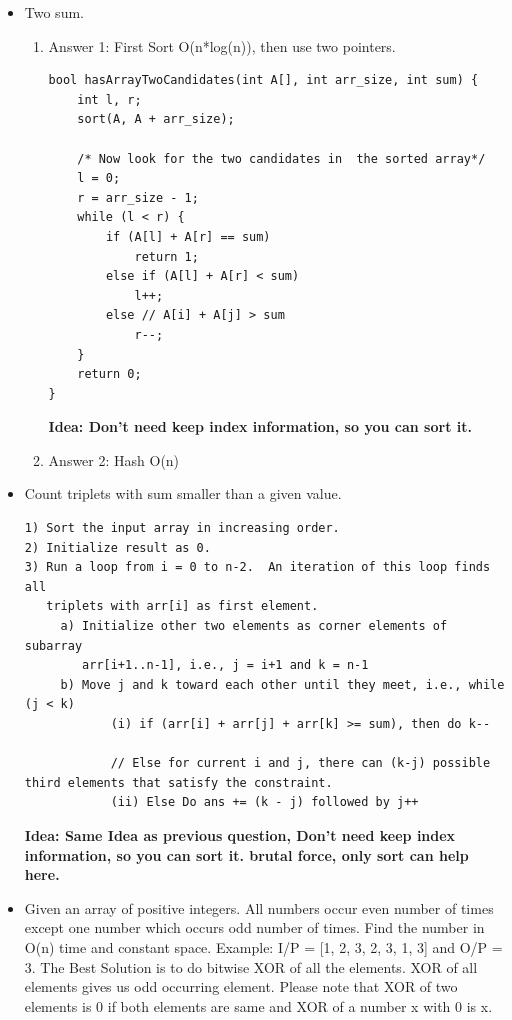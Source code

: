 \documentclass[a4paper,11pt,twoside]{book}
\begin{document}
\begin{itemize}
	\item Two sum. 
\begin{enumerate}
\item Answer 1: First Sort O(n*log(n)), then use two pointers.
\begin{lstlisting}[tabsize=3]
bool hasArrayTwoCandidates(int A[], int arr_size, int sum) { 
	int l, r; 
	sort(A, A + arr_size); 
	
	/* Now look for the two candidates in  the sorted array*/
	l = 0; 
	r = arr_size - 1; 
	while (l < r) { 
		if (A[l] + A[r] == sum) 
			return 1; 
		else if (A[l] + A[r] < sum) 
			l++; 
		else // A[i] + A[j] > sum 
			r--; 
	} 
	return 0; 
} 
\end{lstlisting}
\textbf{Idea: Don't need keep index information, so you can sort it. }

\item Answer 2: Hash O(n)
\end{enumerate}

\item Count triplets with sum smaller than a given value. 
\begin{lstlisting}[breaklines]
1) Sort the input array in increasing order. 
2) Initialize result as 0.
3) Run a loop from i = 0 to n-2.  An iteration of this loop finds all
   triplets with arr[i] as first element.
     a) Initialize other two elements as corner elements of subarray 
        arr[i+1..n-1], i.e., j = i+1 and k = n-1
     b) Move j and k toward each other until they meet, i.e., while (j < k)
            (i) if (arr[i] + arr[j] + arr[k] >= sum), then do k-- 

            // Else for current i and j, there can (k-j) possible third elements that satisfy the constraint.
            (ii) Else Do ans += (k - j) followed by j++ 
\end{lstlisting}
\textbf{Idea: Same Idea as previous question, Don't need keep index information, so you can sort it. brutal force, only sort can help here.}


	\item Given an array of positive integers. All numbers occur even number of times except one number which occurs odd number of times. Find the number in O(n) time and constant space.
Example: I/P = [1, 2, 3, 2, 3, 1, 3] and O/P = 3. The Best Solution is to do bitwise XOR of all the elements. XOR of all elements gives us odd occurring element. Please note that XOR of two elements is 0 if both elements are same and XOR of a number x with 0 is x.


\end{itemize}
\end{document}
